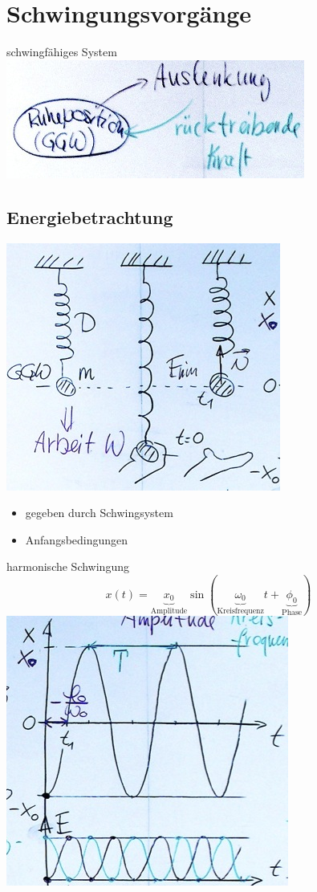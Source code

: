 \chapter{Schwingungsvorgänge}
schwingfähiges System \\
\includegraphics{Bild211}

\section{Energiebetrachtung}
\includegraphics{Bild212} \\
\begin{itemize}
	\item gegeben durch Schwingsystem
	\item Anfangsbedingungen
\end{itemize}
harmonische Schwingung
\[ x(t) = \underbrace{x_0}_{\text{Amplitude}} \sin( \underbrace{\omega_0}_{\text{Kreisfrequenz}} t + \underbrace{\phi_0}_{\text{Phase}} ) \]
\includegraphics{Bild213}
